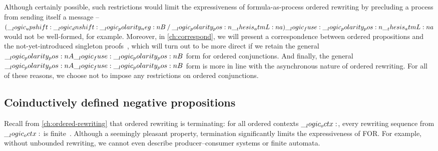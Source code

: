 Although certainly possible, such restrictions would limit the expressiveness of formula-as-process ordered rewriting by precluding a process from sending itself a message -- $(\__logic_upshift: \__logic_dnshift: \__logic_polarity_neg:n {B} \mathbin { / } \__logic_polarity_pos:n {\__thesis_atmL:n {a}}) \__logic_fuse: \__logic_polarity_pos:n {\__thesis_atmL:n {a}}$ would not be well-formed, for example.
Moreover, in \cref{ch:correspond}, we will present a correspondence between ordered propositions and the not-yet-introduced singleton proofs~, which will turn out to be more direct if we retain the general $\__logic_polarity_pos:n {A} \__logic_fuse: \__logic_polarity_pos:n {B}$ form for ordered conjunctions.
And finally, the general $\__logic_polarity_pos:n {A} \__logic_fuse: \__logic_polarity_pos:n {B}$ form is more in line with the asynchronous nature of ordered rewriting.
For all of these reasons, we choose not to impose any restrictions on ordered conjunctions.





\subsection{Coinductively defined negative propositions}\label{sec:formula-as-process:coinductive}

Recall from \cref{ch:ordered-rewriting} that ordered rewriting is terminating: for all ordered contexts $\__logic_octx:$, every rewriting sequence from $\__logic_octx:$ is finite~.
Although a seemingly pleasant property, termination significantly limits the expressiveness of \acl{FOR}.
For example, without unbounded rewriting, we cannot even describe producer--consumer systems or finite automata.

